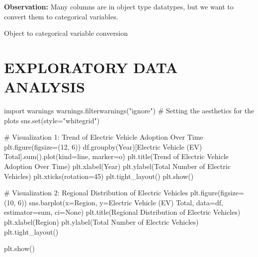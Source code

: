 \documentclass[
  letterpaper,
  DIV=11,
  numbers=noendperiod]{scrartcl}
\newenvironment{Shaded}{\begin{snugshade}}{\end{snugshade}}
\newcommand{\BuiltInTok}[1]{\textcolor[rgb]{0.00,0.23,0.31}{#1}}
\newcommand{\CommentTok}[1]{\textcolor[rgb]{0.37,0.37,0.37}{#1}}
\newcommand{\DecValTok}[1]{\textcolor[rgb]{0.68,0.00,0.00}{#1}}
\newcommand{\ImportTok}[1]{\textcolor[rgb]{0.00,0.46,0.62}{#1}}
\newcommand{\NormalTok}[1]{\textcolor[rgb]{0.00,0.23,0.31}{#1}}
\newcommand{\OperatorTok}[1]{\textcolor[rgb]{0.37,0.37,0.37}{#1}}
\newcommand{\StringTok}[1]{\textcolor[rgb]{0.13,0.47,0.30}{#1}}
\newcommand{\VariableTok}[1]{\textcolor[rgb]{0.07,0.07,0.07}{#1}}
\begin{document}
\textbf{Observation:} Many columns are in object type datatypes, but we
want to convert them to categorical variables.

Object to categorical variable conversion

\hypertarget{exploratory-data-analysis}{%
\section{EXPLORATORY DATA ANALYSIS}\label{exploratory-data-analysis}}

\begin{Shaded}
\begin{Highlighting}[]
\ImportTok{import}\NormalTok{ warnings}
\NormalTok{warnings.filterwarnings(}\StringTok{"ignore"}\NormalTok{)}
\CommentTok{\# Setting the aesthetics for the plots}
\NormalTok{sns.}\BuiltInTok{set}\NormalTok{(style}\OperatorTok{=}\StringTok{"whitegrid"}\NormalTok{)}

\CommentTok{\# Visualization 1: Trend of Electric Vehicle Adoption Over Time}
\NormalTok{plt.figure(figsize}\OperatorTok{=}\NormalTok{(}\DecValTok{12}\NormalTok{, }\DecValTok{6}\NormalTok{))}
\NormalTok{df.groupby(}\StringTok{\textquotesingle{}Year\textquotesingle{}}\NormalTok{)[}\StringTok{\textquotesingle{}Electric Vehicle (EV) Total\textquotesingle{}}\NormalTok{].}\BuiltInTok{sum}\NormalTok{().plot(kind}\OperatorTok{=}\StringTok{\textquotesingle{}line\textquotesingle{}}\NormalTok{, marker}\OperatorTok{=}\StringTok{\textquotesingle{}o\textquotesingle{}}\NormalTok{)}
\NormalTok{plt.title(}\StringTok{\textquotesingle{}Trend of Electric Vehicle Adoption Over Time\textquotesingle{}}\NormalTok{)}
\NormalTok{plt.xlabel(}\StringTok{\textquotesingle{}Year\textquotesingle{}}\NormalTok{)}
\NormalTok{plt.ylabel(}\StringTok{\textquotesingle{}Total Number of Electric Vehicles\textquotesingle{}}\NormalTok{)}
\NormalTok{plt.xticks(rotation}\OperatorTok{=}\DecValTok{45}\NormalTok{)}
\NormalTok{plt.tight\_layout()}
\NormalTok{plt.show()}

\CommentTok{\# Visualization 2: Regional Distribution of Electric Vehicles}
\NormalTok{plt.figure(figsize}\OperatorTok{=}\NormalTok{(}\DecValTok{10}\NormalTok{, }\DecValTok{6}\NormalTok{))}
\NormalTok{sns.barplot(x}\OperatorTok{=}\StringTok{\textquotesingle{}Region\textquotesingle{}}\NormalTok{, y}\OperatorTok{=}\StringTok{\textquotesingle{}Electric Vehicle (EV) Total\textquotesingle{}}\NormalTok{, data}\OperatorTok{=}\NormalTok{df, estimator}\OperatorTok{=}\BuiltInTok{sum}\NormalTok{, ci}\OperatorTok{=}\VariableTok{None}\NormalTok{)}
\NormalTok{plt.title(}\StringTok{\textquotesingle{}Regional Distribution of Electric Vehicles\textquotesingle{}}\NormalTok{)}
\NormalTok{plt.xlabel(}\StringTok{\textquotesingle{}Region\textquotesingle{}}\NormalTok{)}
\NormalTok{plt.ylabel(}\StringTok{\textquotesingle{}Total Number of Electric Vehicles\textquotesingle{}}\NormalTok{)}
\NormalTok{plt.tight\_layout()}

\NormalTok{plt.show()}
\end{Highlighting}
\end{Shaded}
\end{document}
